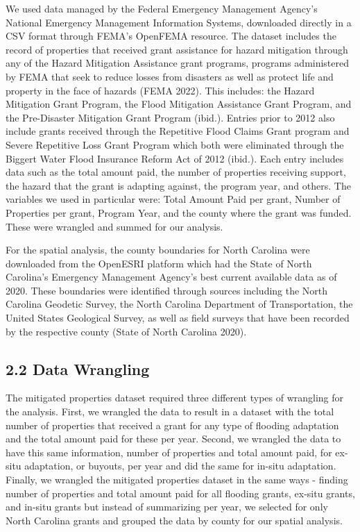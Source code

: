 \documentclass[
  12pt,
]{article}
\begin{document}
We used data managed by the Federal Emergency Management Agency's
National Emergency Management Information Systems, downloaded directly
in a CSV format through FEMA's OpenFEMA resource. The dataset includes
the record of properties that received grant assistance for hazard
mitigation through any of the Hazard Mitigation Assistance grant
programs, programs administered by FEMA that seek to reduce losses from
disasters as well as protect life and property in the face of hazards
(FEMA 2022). This includes: the Hazard Mitigation Grant Program, the
Flood Mitigation Assistance Grant Program, and the Pre-Disaster
Mitigation Grant Program (ibid.). Entries prior to 2012 also include
grants received through the Repetitive Flood Claims Grant program and
Severe Repetitive Loss Grant Program which both were eliminated through
the Biggert Water Flood Insurance Reform Act of 2012 (ibid.). Each entry
includes data such as the total amount paid, the number of properties
receiving support, the hazard that the grant is adapting against, the
program year, and others. The variables we used in particular were:
Total Amount Paid per grant, Number of Properties per grant, Program
Year, and the county where the grant was funded. These were wrangled and
summed for our analysis.

For the spatial analysis, the county boundaries for North Carolina were
downloaded from the OpenESRI platform which had the State of North
Carolina's Emergency Management Agency's best current available data as
of 2020. These boundaries were identified through sources including the
North Carolina Geodetic Survey, the North Carolina Department of
Transportation, the United States Geological Survey, as well as field
surveys that have been recorded by the respective county (State of North
Carolina 2020).

\hypertarget{data-wrangling}{%
\subsection{2.2 Data Wrangling}\label{data-wrangling}}

The mitigated properties dataset required three different types of
wrangling for the analysis. First, we wrangled the data to result in a
dataset with the total number of properties that received a grant for
any type of flooding adaptation and the total amount paid for these per
year. Second, we wrangled the data to have this same information, number
of properties and total amount paid, for ex-situ adaptation, or buyouts,
per year and did the same for in-situ adaptation. Finally, we wrangled
the mitigated properties dataset in the same ways - finding number of
properties and total amount paid for all flooding grants, ex-situ
grants, and in-situ grants but instead of summarizing per year, we
selected for only North Carolina grants and grouped the data by county
for our spatial analysis.
\end{document}
